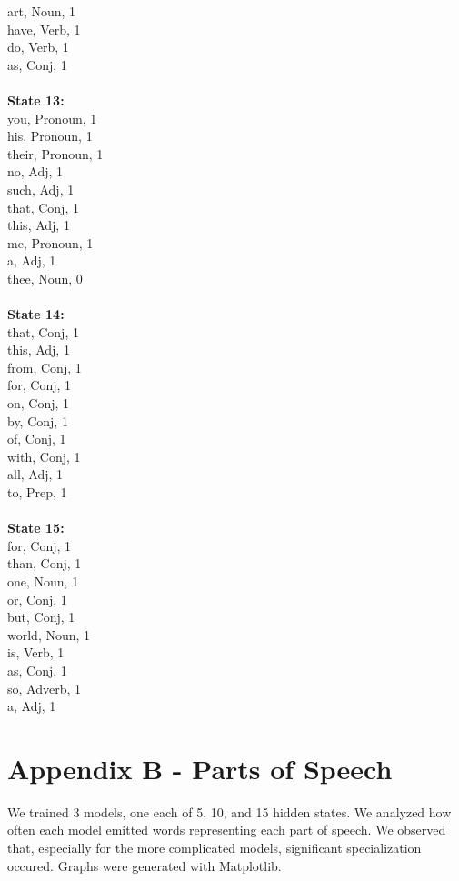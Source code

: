 \begin{multicols}{4}
art, Noun, 1\\
have, Verb, 1\\
do, Verb, 1\\
as, Conj, 1\\
\\
\noindent\textbf{State 13:} \\
you, Pronoun, 1\\
his, Pronoun, 1\\
their, Pronoun, 1\\
no, Adj, 1\\
such, Adj, 1\\
that, Conj, 1\\
this, Adj, 1\\
me, Pronoun, 1\\
a, Adj, 1\\
thee, Noun, 0\\
\\
\noindent\textbf{State 14:} \\
that, Conj, 1\\
this, Adj, 1\\
from, Conj, 1\\
for, Conj, 1\\
on, Conj, 1\\
by, Conj, 1\\
of, Conj, 1\\
with, Conj, 1\\
all, Adj, 1\\
to, Prep, 1\\
\\
\noindent\textbf{State 15:} \\
for, Conj, 1\\
than, Conj, 1\\
one, Noun, 1\\
or, Conj, 1\\
but, Conj, 1\\
world, Noun, 1\\
is, Verb, 1\\
as, Conj, 1\\
so, Adverb, 1\\
a, Adj, 1\\

\end{multicols}

\pagebreak
\section{Appendix B - Parts of Speech}
We trained 3 models, one each of 5, 10, and 15 hidden states. We analyzed how often each model emitted words representing each part of speech. We observed that, especially for the more complicated models, significant specialization occured. Graphs were generated with Matplotlib.

